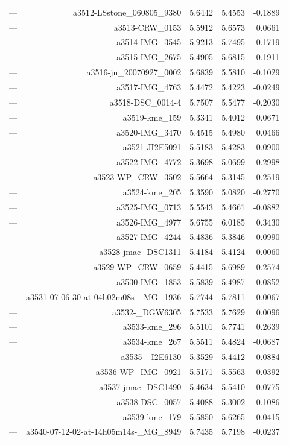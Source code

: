\begin{table}[htbp]
\begin{tabular}{lrrrr}
— & a3512-LSstone_060805_9380 & 5.6442 & 5.4553 & -0.1889 \\
— & a3513-CRW_0153 & 5.5912 & 5.6573 & 0.0661 \\
— & a3514-IMG_3545 & 5.9213 & 5.7495 & -0.1719 \\
— & a3515-IMG_2675 & 5.4905 & 5.6815 & 0.1911 \\
— & a3516-jn_20070927_0002 & 5.6839 & 5.5810 & -0.1029 \\
— & a3517-IMG_4763 & 5.4472 & 5.4223 & -0.0249 \\
— & a3518-DSC_0014-4 & 5.7507 & 5.5477 & -0.2030 \\
— & a3519-kme_159 & 5.3341 & 5.4012 & 0.0671 \\
— & a3520-IMG_3470 & 5.4515 & 5.4980 & 0.0466 \\
— & a3521-JI2E5091 & 5.5183 & 5.4283 & -0.0900 \\
— & a3522-IMG_4772 & 5.3698 & 5.0699 & -0.2998 \\
— & a3523-WP_CRW_3502 & 5.5664 & 5.3145 & -0.2519 \\
— & a3524-kme_205 & 5.3590 & 5.0820 & -0.2770 \\
— & a3525-IMG_0713 & 5.5543 & 5.4661 & -0.0882 \\
— & a3526-IMG_4977 & 5.6755 & 6.0185 & 0.3430 \\
— & a3527-IMG_4244 & 5.4836 & 5.3846 & -0.0990 \\
— & a3528-jmac_DSC1311 & 5.4184 & 5.4124 & -0.0060 \\
— & a3529-WP_CRW_0659 & 5.4415 & 5.6989 & 0.2574 \\
— & a3530-IMG_1853 & 5.5839 & 5.4987 & -0.0852 \\
— & a3531-07-06-30-at-04h02m08s-_MG_1936 & 5.7744 & 5.7811 & 0.0067 \\
— & a3532-_DGW6305 & 5.7533 & 5.7629 & 0.0096 \\
— & a3533-kme_296 & 5.5101 & 5.7741 & 0.2639 \\
— & a3534-kme_267 & 5.5511 & 5.4824 & -0.0687 \\
— & a3535-_I2E6130 & 5.3529 & 5.4412 & 0.0884 \\
— & a3536-WP_IMG_0921 & 5.5171 & 5.5563 & 0.0392 \\
— & a3537-jmac_DSC1490 & 5.4634 & 5.5410 & 0.0775 \\
— & a3538-DSC_0057 & 5.4088 & 5.3002 & -0.1086 \\
— & a3539-kme_179 & 5.5850 & 5.6265 & 0.0415 \\
— & a3540-07-12-02-at-14h05m14s-_MG_8949 & 5.7435 & 5.7198 & -0.0237 \\

\end{tabular}
\end{table}

